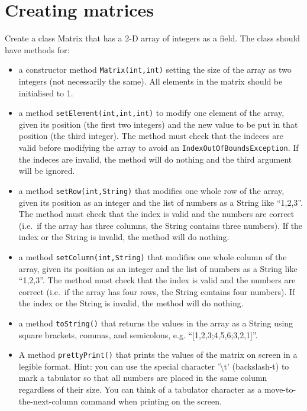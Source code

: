 \documentclass{article}
\begin{document}
\section{Creating matrices}
\label{sec:creating-matrices}

Create a class Matrix that has a 2-D array of integers as a field. The
class should have methods for: 

\begin{itemize}
\item a constructor method \verb+Matrix(int,int)+ setting the size of
  the array as two 
  integers (not necessarily the same). All elements in the matrix
  should be initialised to 1. 
\item a method \verb+setElement(int,int,int)+ to modify one element
  of the array, given its position 
  (the first two integers) and the new value to be put in that 
  position (the third integer).
  The method must check that the indeces are valid
  before modifying the array to avoid an
  \verb+IndexOutOfBoundsException+. If the indeces are invalid, the
  method will do nothing and the third argument will be ignored.
\item a method \verb+setRow(int,String)+ that modifies one whole row
  of the array, given its position 
  as an integer and the list of numbers as a String like ``1,2,3''. 
  The method must check that the index is valid and the numbers are
  correct (i.e.~if the array has three columns, the String contains
  three numbers). If the index or the String is invalid, the
  method will do nothing. 
\item a method \verb+setColumn(int,String)+ that modifies one whole 
  column of the array, given its position 
  as an integer and the list of numbers as a String like ``1,2,3''. 
  The method must check that the index is valid and the numbers are
  correct (i.e.~if the array has four rows, the String contains
  four numbers). If the index or the String is invalid, the
  method will do nothing.
\item a method \verb+toString()+ that returns the values in the array
  as a String using square brackets, commas, and semicolons,
  e.g. ``[1,2,3;4,5,6;3,2,1]''. 
\item A method \verb+prettyPrint()+ that prints the values of the
  matrix on screen in a legible format. Hint: you can use the
  special character '\textbackslash t' (backslash-t) 
  to mark a tabulator so that all numbers are
  placed in the same column regardless of their size. You can think of
  a tabulator character as a move-to-the-next-column command when
  printing on the screen. 
\end{itemize}
\end{document}
